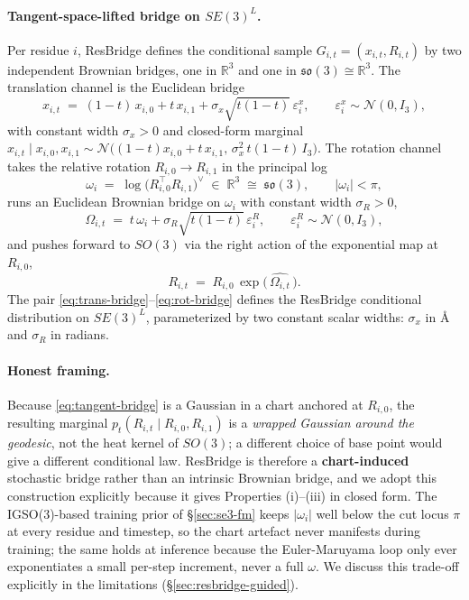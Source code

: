 \documentclass{article}
\begin{document}
\paragraph{Tangent-space-lifted bridge on $SE(3)^L$.}
Per residue $i$, ResBridge defines the conditional sample $G_{i,t}=(x_{i,t},R_{i,t})$ by two independent Brownian bridges, one in $\mathbb{R}^3$ and one in $\mathfrak{so}(3)\!\cong\!\mathbb{R}^3$. The translation channel is the Euclidean bridge
\begin{equation}
x_{i,t}\;=\;(1-t)\,x_{i,0}+t\,x_{i,1}+\sigma_x\sqrt{t(1-t)}\,\varepsilon^{x}_i,
\qquad \varepsilon^{x}_i\sim\mathcal{N}(0,I_3),
\label{eq:trans-bridge}
\end{equation}
with constant width $\sigma_x>0$ and closed-form marginal $x_{i,t}\!\mid\!x_{i,0},x_{i,1}\sim\mathcal{N}\!\bigl((1-t)x_{i,0}+t\,x_{i,1},\,\sigma_x^2\,t(1-t)\,I_3\bigr)$. The rotation channel takes the relative rotation $R_{i,0}\!\to\!R_{i,1}$ in the principal log
\begin{equation}
\omega_i\;=\;\log\!\bigl(R_{i,0}^{\!\top}R_{i,1}\bigr)^{\!\vee}\;\in\;\mathbb{R}^{3}\;\cong\;\mathfrak{so}(3),
\qquad |\omega_i|<\pi,
\label{eq:rel-omega}
\end{equation}
runs an Euclidean Brownian bridge on $\omega_i$ with constant width $\sigma_R>0$,
\begin{equation}
\Omega_{i,t}\;=\;t\,\omega_i+\sigma_R\sqrt{t(1-t)}\,\varepsilon^{R}_i,
\qquad \varepsilon^{R}_i\sim\mathcal{N}(0,I_3),
\label{eq:tangent-bridge}
\end{equation}
and pushes forward to $SO(3)$ via the right action of the exponential map at $R_{i,0}$,
\begin{equation}
R_{i,t}\;=\;R_{i,0}\,\exp\!\bigl(\,\widehat{\Omega_{i,t}}\,\bigr).
\label{eq:rot-bridge}
\end{equation}
The pair \eqref{eq:trans-bridge}--\eqref{eq:rot-bridge} defines the ResBridge conditional distribution on $SE(3)^L$, parameterized by two constant scalar widths: $\sigma_x$ in {\AA} and $\sigma_R$ in radians.

\paragraph{Honest framing.}
Because \eqref{eq:tangent-bridge} is a Gaussian in a chart anchored at $R_{i,0}$, the resulting marginal $p_t(R_{i,t}\!\mid\!R_{i,0},R_{i,1})$ is a \emph{wrapped Gaussian around the geodesic}, not the heat kernel of $SO(3)$; a different choice of base point would give a different conditional law. ResBridge is therefore a \textbf{chart-induced} stochastic bridge rather than an intrinsic Brownian bridge, and we adopt this construction explicitly because it gives Properties (i)--(iii) in closed form. The IGSO(3)-based training prior of \S\ref{sec:se3-fm} keeps $|\omega_i|$ well below the cut locus $\pi$ at every residue and timestep, so the chart artefact never manifests during training; the same holds at inference because the Euler-Maruyama loop only ever exponentiates a small per-step increment, never a full $\omega$. We discuss this trade-off explicitly in the limitations (\S\ref{sec:resbridge-guided}).
\end{document}
